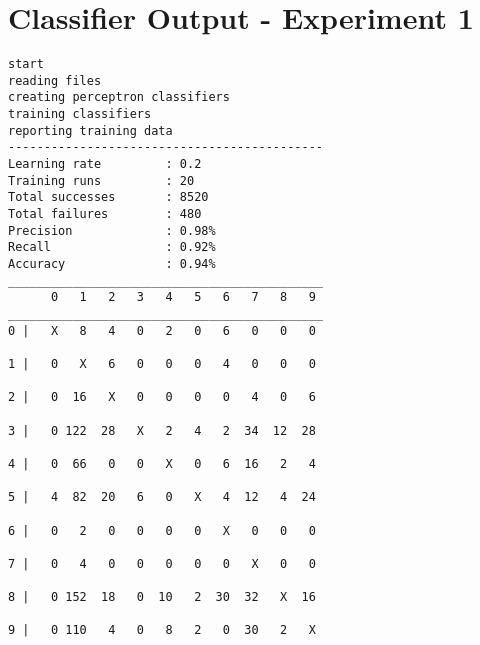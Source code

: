 \documentclass[titlepage,11pt]{article}
\begin{document}
\section[4]{Classifier Output - Experiment 1} {
\begin{verbatim}
start
reading files
creating perceptron classifiers
training classifiers
reporting training data
--------------------------------------------
Learning rate         : 0.2
Training runs         : 20
Total successes       : 8520
Total failures        : 480
Precision             : 0.98%
Recall                : 0.92%
Accuracy              : 0.94%
____________________________________________
      0   1   2   3   4   5   6   7   8   9
____________________________________________
0 |   X   8   4   0   2   0   6   0   0   0

1 |   0   X   6   0   0   0   4   0   0   0

2 |   0  16   X   0   0   0   0   4   0   6

3 |   0 122  28   X   2   4   2  34  12  28

4 |   0  66   0   0   X   0   6  16   2   4

5 |   4  82  20   6   0   X   4  12   4  24

6 |   0   2   0   0   0   0   X   0   0   0

7 |   0   4   0   0   0   0   0   X   0   0

8 |   0 152  18   0  10   2  30  32   X  16

9 |   0 110   4   0   8   2   0  30   2   X


\end{verbatim}}
\end{document}

